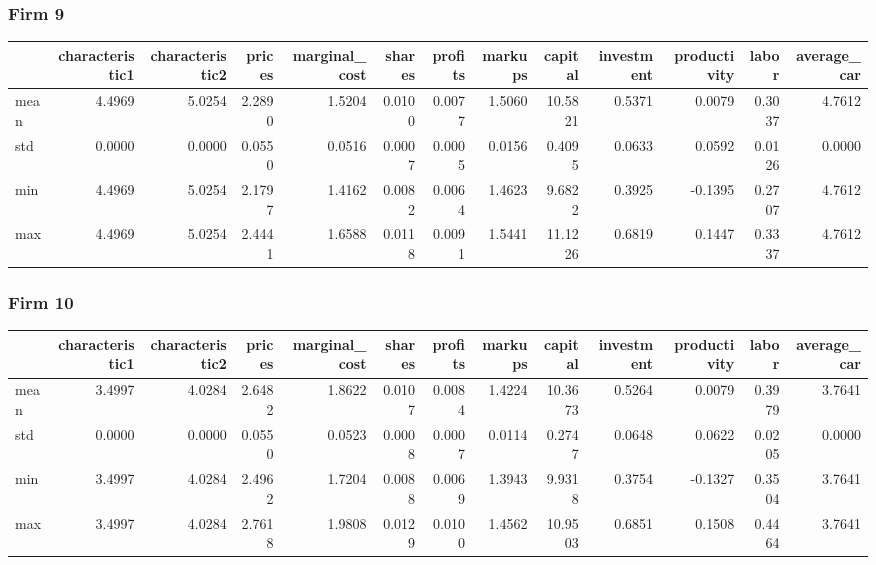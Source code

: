  \subsubsection*{Firm 9}
\begin{tabular}{lrrrrrrrrrrrr}
\toprule
{} &  characteristic1 &  characteristic2 &  prices &  marginal\_cost &  shares &  profits &  markups &  capital &  investment &  productivity &  labor &  average\_car \\
\midrule
mean &           4.4969 &           5.0254 &  2.2890 &         1.5204 &  0.0100 &   0.0077 &   1.5060 &  10.5821 &      0.5371 &        0.0079 & 0.3037 &       4.7612 \\
std  &           0.0000 &           0.0000 &  0.0550 &         0.0516 &  0.0007 &   0.0005 &   0.0156 &   0.4095 &      0.0633 &        0.0592 & 0.0126 &       0.0000 \\
min  &           4.4969 &           5.0254 &  2.1797 &         1.4162 &  0.0082 &   0.0064 &   1.4623 &   9.6822 &      0.3925 &       -0.1395 & 0.2707 &       4.7612 \\
max  &           4.4969 &           5.0254 &  2.4441 &         1.6588 &  0.0118 &   0.0091 &   1.5441 &  11.1226 &      0.6819 &        0.1447 & 0.3337 &       4.7612 \\
\bottomrule
\end{tabular}


 \subsubsection*{Firm 10}
\begin{tabular}{lrrrrrrrrrrrr}
\toprule
{} &  characteristic1 &  characteristic2 &  prices &  marginal\_cost &  shares &  profits &  markups &  capital &  investment &  productivity &  labor &  average\_car \\
\midrule
mean &           3.4997 &           4.0284 &  2.6482 &         1.8622 &  0.0107 &   0.0084 &   1.4224 &  10.3673 &      0.5264 &        0.0079 & 0.3979 &       3.7641 \\
std  &           0.0000 &           0.0000 &  0.0550 &         0.0523 &  0.0008 &   0.0007 &   0.0114 &   0.2747 &      0.0648 &        0.0622 & 0.0205 &       0.0000 \\
min  &           3.4997 &           4.0284 &  2.4962 &         1.7204 &  0.0088 &   0.0069 &   1.3943 &   9.9318 &      0.3754 &       -0.1327 & 0.3504 &       3.7641 \\
max  &           3.4997 &           4.0284 &  2.7618 &         1.9808 &  0.0129 &   0.0100 &   1.4562 &  10.9503 &      0.6851 &        0.1508 & 0.4464 &       3.7641 \\
\bottomrule
\end{tabular}


